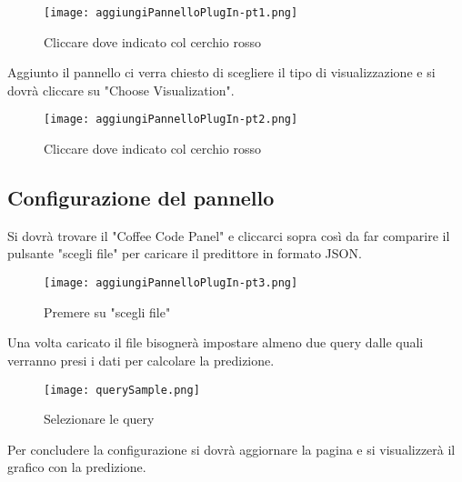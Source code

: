 \documentclass[../manuale-utente.tex]{subfiles}
\begin{document}
\begin{figure}[h!]
  \begin{center}
    \texttt{[image: aggiungiPannelloPlugIn-pt1.png]}\\
    \caption{Cliccare dove indicato col cerchio rosso}%
    \label{fig:aggiungi-pannello}
  \end{center}
\end{figure}

Aggiunto il pannello ci verra chiesto di scegliere il tipo di visualizzazione e si dovrà cliccare su "Choose Visualization".

\begin{figure}[h!]
  \begin{center}
    \texttt{[image: aggiungiPannelloPlugIn-pt2.png]}\\
    \caption{Cliccare dove indicato col cerchio rosso}%
    \label{fig:scegliere-la-visualizzazione}
  \end{center}
\end{figure}

\newpage
\subsection{Configurazione del pannello}

Si dovrà trovare il "Coffee Code Panel" e cliccarci sopra così da far comparire il pulsante "scegli file" per caricare il predittore in formato JSON.

\begin{figure}[h!]
    \begin{center}
      \texttt{[image: aggiungiPannelloPlugIn-pt3.png]}\\
      \caption{Premere su "scegli file"}%
      \label{fig:scelta-del-file}
    \end{center}
  \end{figure}

Una volta caricato il file bisognerà impostare almeno due query dalle quali verranno presi i dati per calcolare la predizione.

\begin{figure}[h!]
    \begin{center}
      \texttt{[image: querySample.png]}\\
      \caption{Selezionare le query}%
      \label{fig:selezionare-le-query}
    \end{center}
  \end{figure}
  \newpage
Per concludere la configurazione si dovrà aggiornare la pagina e si visualizzerà il grafico con la predizione.
\end{document}
